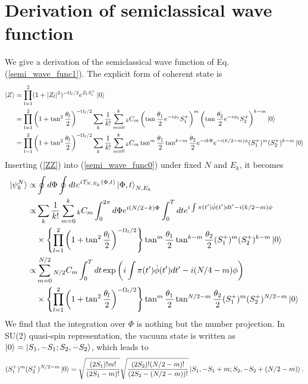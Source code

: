 \documentclass[%
superscriptaddress,
preprint,
showpacs,
nofootinbib,
amsmath,amssymb,
aps,
prc,
floatfix ]%
{revtex4-1}
\begin{document}
\appendix
\section{Derivation of semiclassical wave function}

We give a derivation of the semiclassical wave function
of Eq. (\ref{semi_wave_func1}).
The explicit form of coherent state is
\begin{align}
  \ket{Z} &= \prod_{l=1}^2(1+|Z_l|^2)^{-\Omega_l/2}e^{Z_lS_l^{+}}\ket{0} \nonumber \\
  &= \prod_{l=1}^2\left(1+\tan^2{\frac{\theta_l}{2}}\right)^{-\Omega_l/2} \sum_k \frac{1}{k!} \sum_{m=0}^k
  {}_kC_m \left(
  \tan{\frac{\theta_1}{2}}e^{-i\phi_1}S_1^{+} \right)^m \left(
  \tan{\frac{\theta_2}{2}}e^{-i\phi_2}S_2^{+} \right)^{k-m} \ket{0} \nonumber \\
  &= \prod_{l=1}^2\left(1+\tan^2{\frac{\theta_l}{2}}\right)^{-\Omega_l/2} \sum_k \frac{1}{k!} \sum_{m=0}^k
  {}_kC_m \tan^m{\frac{\theta_1}{2}}\tan^{k-m}{\frac{\theta_2}{2}}e^{-ik\Phi}e^{-i(k/2-m)\phi}
  (S_1^{+})^m(S_2^{+})^{k-m} \ket{0}
  \label{ZZ}
\end{align} 
Inserting (\ref{ZZ}) into (\ref{semi_wave_func0}) under fixed $N$ and $E_k$,
it becomes
\begin{align}
	\ket{\psi_k^N} \propto& \oint d\Phi \oint dt
	e^{i\mathcal{T}_{N,E_k}(\Phi, t)}
	\ket{\Phi,t}_{N,E_k} \nonumber \\
  \propto& \sum_k \frac{1}{k!} \sum_{m=0}^k{}_kC_m \int_0^{2\pi} d\Phi e^{i(N/2-k)\Phi} 
  \int_0^T dt e^{i\int \pi(t') \dot{\phi}(t') dt'-i(k/2-m)\phi} \nonumber \\
  &\times \left\{ \prod_{l=1}^2\left(1+\tan^2{\frac{\theta_l}{2}}\right)^{-\Omega_l/2} \right\}
\tan^m{\frac{\theta_1}{2}}\tan^{k-m}\frac{\theta_2}{2}(S_1^{+})^m(S_2^{+})^{k-m} \ket{0} \nonumber \\
  \propto& \sum_{m=0}^{N/2}{}_{N/2}C_m  \int_0^T dt \exp{\left( i\int \pi(t') \dot{\phi}(t') dt'-i(N/4-m)\phi \right)} \nonumber \\
  &\times \left\{ \prod_{l=1}^2\left(1+\tan^2{\frac{\theta_l}{2}}\right)^{-\Omega_l/2} \right\} 
\tan^m{\frac{\theta_1}{2}}\tan^{N/2-m}\frac{\theta_2}{2} (S_1^{+})^m(S_2^{+})^{N/2-m} \ket{0} \label{semi_wave_func_b}
\end{align}
We find that the integration over $\Phi$ is nothing but the number projection.
In SU(2) quasi-spin representation, the vacuum state is written as
$\ket{0}=\ket{S_1,-S_1;S_2,-S_2}$, which leads to
\begin{align}
  (S_1^{+})^m(S_2^{+})^{N/2-m} \ket{0} 
  = \sqrt{\frac{(2S_1)!m!}{(2S_1-m)!}} \sqrt{\frac{(2S_2)!(N/2-m)!}{(2S_2-(N/2-m))!}}
  \ket{S_1,-S_1+m;S_2,-S_2+(N/2-m)}.
\end{align}
\end{document}
